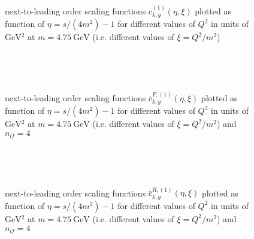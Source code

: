 \pagebreak
\begin{figure}[ht!]
\centering
\begin{subfigure}[t]{\textwidth}
	
\end{subfigure}\\%
\begin{subfigure}[t]{\textwidth}
	
\end{subfigure}\\%
\begin{subfigure}[t]{\textwidth}
	
\end{subfigure}
\caption{next-to-leading order scaling functions $c_{k,g}^{(1)}(\eta,\xi)$ plotted as function of $\eta=s/(4m^2)-1$ for different values of $Q^2$ in units of $\si{\GeV^2}$ at $m=\SI{4.75}{\GeV}$ (i.e. different values of $\xi=Q^2/m^2$) }\label{fig:cg1}
\end{figure}

\pagebreak
\begin{figure}[ht!]
\centering
\begin{subfigure}[t]{\textwidth}
	
\end{subfigure}\\%
\begin{subfigure}[t]{\textwidth}
	
\end{subfigure}\\%
\begin{subfigure}[t]{\textwidth}
	
\end{subfigure}
\caption{next-to-leading order scaling functions $\bar c_{k,g}^{F,(1)}(\eta,\xi)$ plotted as function of $\eta=s/(4m^2)-1$ for different values of $Q^2$ in units of $\si{\GeV^2}$ at $m=\SI{4.75}{\GeV}$ (i.e. different values of $\xi=Q^2/m^2$) and $n_{lf}=4$ }\label{fig:cgBarF1}
\end{figure}

\pagebreak
\begin{figure}[ht!]
\centering
\begin{subfigure}[t]{\textwidth}
	
\end{subfigure}\\%
\begin{subfigure}[t]{\textwidth}
	
\end{subfigure}\\%
\begin{subfigure}[t]{\textwidth}
	
\end{subfigure}
\caption{next-to-leading order scaling functions $\bar c_{k,g}^{R,(1)}(\eta,\xi)$ plotted as function of $\eta=s/(4m^2)-1$ for different values of $Q^2$ in units of $\si{\GeV^2}$ at $m=\SI{4.75}{\GeV}$ (i.e. different values of $\xi=Q^2/m^2$) and $n_{lf}=4$ }\label{fig:cgBarR1}
\end{figure}

